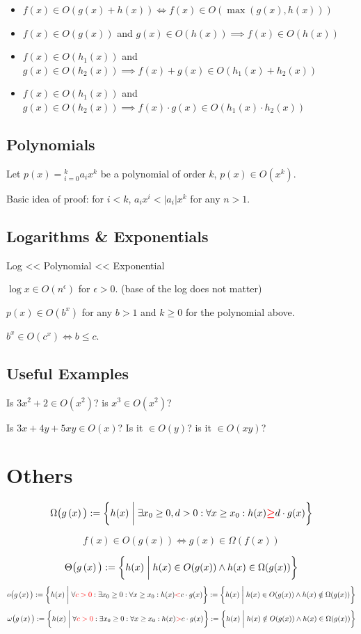 \begin{itemize}
\item $f(x) \in O(g(x) + h(x)) \iff f(x) \in O(\max(g(x),h(x)))$
\item $f(x) \in O(g(x))$ and $g(x) \in O(h(x)) \implies f(x) \in O(h(x))$
\item $f(x) \in O(h_1(x))$ and $g(x) \in O(h_2(x)) \implies f(x) + g(x) \in O(h_1(x) + h_2(x))$
\item $f(x) \in O(h_1(x))$ and $g(x) \in O(h_2(x)) \implies f(x) \cdot g(x) \in O(h_1(x) \cdot h_2(x))$
\end{itemize}

\subsection{Polynomials}
Let $p(x) = \displaystyle_{i=0}^k a_ix^k$ be a polynomial of order $k$,
$p(x) \in O(x^k)$.

Basic idea of proof: for $i<k$, $a_ix^i < |a_i|x^k$ for any $n>1$. 

\subsection{Logarithms \& Exponentials}
Log << Polynomial << Exponential

$\log x \in O(n^\epsilon)$ for $\epsilon >0$. (base of the log does not matter)

$p(x) \in O(b^x)$ for any $b>1$ and $k\ge 0$ for the polynomial above.

$b^x \in O(c^x) \iff b \le c$. 

\subsection{Useful Examples}
Is $3x^2+2 \in O(x^2)$? is $x^3 \in O(x^2)$?

Is $3x+4y+5xy \in O(x)$? Is it $\in O(y)$? is it $\in O(xy)$?

\section{Others}
\[
\Omega\big(g\left(x\right)\big) := \bigg\{h(x) \biggm| \exists x_0 \ge 0, d > 0 : \forall x \ge x_0 : h(x) {\color{red}\boldsymbol{\ge}} d \cdot g(x) \bigg\}
\]
 \begin{tcolorbox}
 \[f(x) \in O(g(x)) \iff g(x) \in \Omega(f(x))\]
 \end{tcolorbox}
\[
\Theta\big(g\left(x\right)\big) := \bigg\{h(x) \biggm| h(x) \in O( g(x)) \wedge h(x) \in \Omega(g(x)) \bigg\}
\]
\[
o\big(g\left(x\right)\big) := \bigg\{h(x) \biggm| {\forall \color{red}c>0}  : \exists x_0 \ge 0: \forall x \ge x_0 : h(x) {\color{red}<} c \cdot g(x) \bigg\}  := \bigg\{h(x) \biggm| h(x) \in O( g(x)) \wedge h(x) \notin \Omega(g(x)) \bigg\}
\]
\[
\omega\big(g\left(x\right)\big) := \bigg\{h(x) \biggm| {\forall \color{red}c>0} : \exists x_0 \ge 0 : \forall x \ge x_0 : h(x) {\color{red}>} c \cdot g(x) \bigg\}  := \bigg\{h(x) \biggm| h(x) \notin O( g(x)) \wedge h(x) \in \Omega(g(x)) \bigg\}
\]

